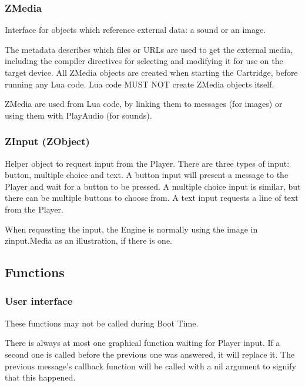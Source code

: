 \documentclass{article}
\begin{document}
\subsubsection{ZMedia}
Interface for objects which reference external data: a sound or an image.

The metadata describes which files or URLs are used to get the external media,
including the compiler directives for selecting and modifying it for use on the
target device. All ZMedia objects are created when starting the Cartridge,
before running any Lua code.  Lua code MUST NOT create ZMedia objects itself.

ZMedia are used from Lua code, by linking them to messages (for images) or
using them with PlayAudio (for sounds).

\subsubsection{ZInput (ZObject)}
Helper object to request input from the Player. There are three types of input:
button, multiple choice and text. A button input will present a message to the
Player and wait for a button to be pressed. A multiple choice input is similar,
but there can be multiple buttons to choose from. A text input requests a line
of text from the Player.

When requesting the input, the Engine is normally using the image in
zinput.Media as an illustration, if there is one.

\subsection{Functions}
\subsubsection{User interface}
These functions may not be called during Boot Time.

There is always at most one graphical function waiting for Player input. If a
second one is called before the previous one was answered, it will replace it.
The previous message's callback function will be called with a nil argument to
signify that this happened.
\end{document}

